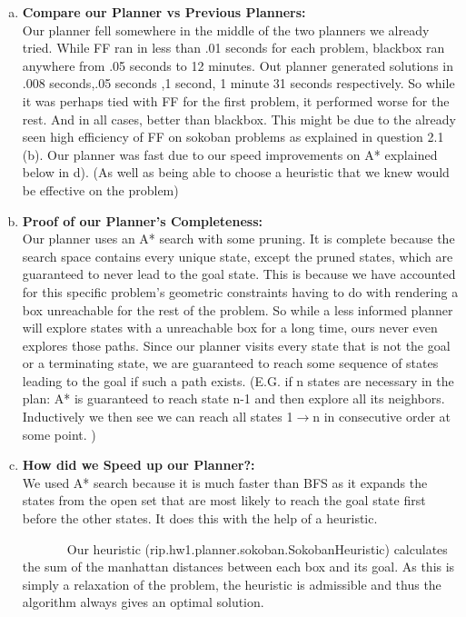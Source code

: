 \documentclass[]{article}
\begin{document}
\begin{enumerate}[(a)]
		\item \textbf{Compare our Planner vs Previous Planners:}\\
		Our planner fell somewhere in the middle of the two planners we already tried. While FF ran in less than .01 seconds for each problem, blackbox ran anywhere from .05 seconds to 12 minutes. Out planner generated solutions in .008 seconds,.05 seconds ,1 second, 1 minute 31 seconds respectively. So while it was perhaps tied with FF for the first problem, it performed worse for the rest. And in all cases, better than blackbox. This might be due to the already seen high efficiency of FF on sokoban problems as explained in question 2.1 (b). Our planner was fast due to our speed improvements on A* explained below in d). (As well as being able to choose a heuristic that we knew would be effective on the problem)\\
		
		\item \textbf{Proof of our Planner's Completeness:}\\
		Our planner uses an A* search with some pruning. It is complete because the search space contains every unique state, except the pruned states, which are guaranteed to never lead to the goal state. This is because we have accounted for this specific problem's geometric constraints having to do with rendering a box unreachable for the rest of the problem. So while a less informed planner will explore states with a unreachable box for a long time, ours never even explores those paths. Since our planner visits every state that is not the goal or a terminating state, we are guaranteed to reach some sequence of states leading to the goal if such a path exists. (E.G. if n states are necessary in the plan: A* is guaranteed to reach state n-1 and then explore all its neighbors. Inductively we then see we can reach all states 1\(\rightarrow\)n in consecutive order at some point. )\\
		
		\item \textbf{How did we Speed up our Planner?:}\\
		We used A* search because it is much faster than BFS as it expands the states from the open set that are most likely to reach the goal state first before the other states. It does this with the help of a heuristic.
		
		~~~~~~~Our heuristic (rip.hw1.planner.sokoban.SokobanHeuristic) calculates the sum of the manhattan distances between each box and its goal. As this is simply a relaxation of the problem, the heuristic is admissible and thus the algorithm always gives an optimal solution.
		

\end{enumerate}
\end{document}
